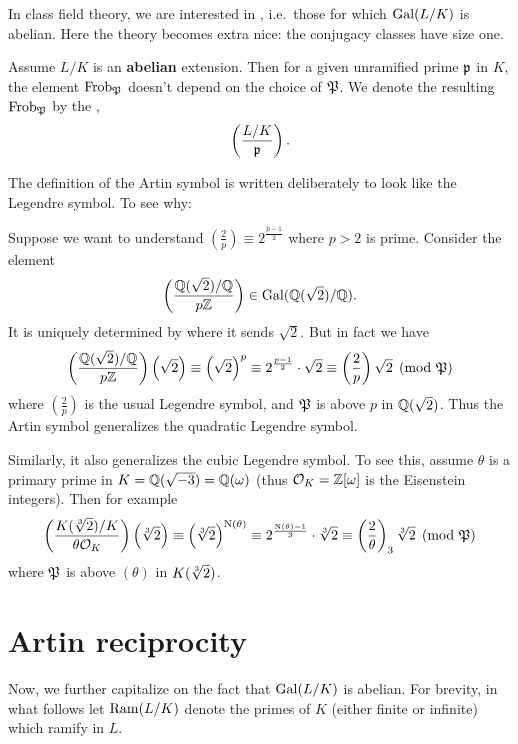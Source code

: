 In class field theory, we are interested in ,
i.e.\ those for which $\operatorname{Gal}(L/K)$ is abelian.
Here the theory becomes extra nice:
the conjugacy classes have size one.
\begin{definition}
	Assume $L/K$ is an \textbf{abelian} extension.
	Then for a given unramified prime $\mathfrak p$ in $K$,
	the element $\mathrm{Frob}_\mathfrak P$ doesn't depend on the choice of $\mathfrak P$.
	We denote the resulting $\mathrm{Frob}_\mathfrak P$ by the ,
	\[ \left( \frac{L/K}{\mathfrak p} \right). \]
\end{definition}
The definition of the Artin symbol is written deliberately to
look like the Legendre symbol.
To see why:
\begin{example}
	Suppose we want to understand
	$\left( \frac 2p \right) \equiv 2^{\frac{p-1}{2}}$ where $p > 2$ is prime.
	Consider the element
	\[ \left( \frac{\mathbb Q(\sqrt 2)/\mathbb Q}{p\mathbb Z} \right)
		\in \operatorname{Gal}(\mathbb Q(\sqrt 2) / \mathbb Q). \]
	It is uniquely determined by where it sends $\sqrt 2$.
	But in fact we have
	\[
		\left( \frac{\mathbb Q(\sqrt 2)/\mathbb Q}{p\mathbb Z} \right) \left( \sqrt 2 \right)
		\equiv \left( \sqrt 2 \right)^{p}
		\equiv 2^{\frac{p-1}{2}} \cdot \sqrt 2
		\equiv \left( \frac 2p \right) \sqrt 2
		\pmod{\mathfrak P}
	\]
	where $\left( \frac 2p \right)$ is the usual Legendre symbol,
	and $\mathfrak P$ is above $p$ in $\mathbb Q(\sqrt 2)$.
	Thus the Artin symbol generalizes the quadratic Legendre symbol.
\end{example}
\begin{example}
	\label{ex:cubic_legendre_artin}
	Similarly, it also generalizes the cubic Legendre symbol.
	To see this, assume $\theta$ is a primary prime
	in $K = \mathbb Q(\sqrt{-3}) = \mathbb Q(\omega)$
	(thus $\mathcal O_K = \mathbb Z[\omega]$ is the Eisenstein integers).
	Then for example
	\[
		\left( \frac{K(\sqrt[3]{2})/K}{\theta \mathcal O_K} \right) \left( \sqrt[3]{2} \right)
		\equiv \left( \sqrt[3]{2} \right)^{\operatorname{N}(\theta)}
		\equiv 2^{\frac{\operatorname{N}(\theta)-1}{3}} \cdot \sqrt[3]{2}
		\equiv \left( \frac{2}{\theta} \right)_3 \sqrt[3]{2}
		\pmod{\mathfrak P}
	\]
	where $\mathfrak P$ is above $(\theta)$ in $K(\sqrt[3]{2})$.
\end{example}

\section{Artin reciprocity}
Now, we further capitalize on the fact that $\operatorname{Gal}(L/K)$ is abelian.
For brevity, in what follows let $\operatorname{Ram}(L/K)$ denote the primes of $K$
(either finite or infinite) which ramify in $L$.


